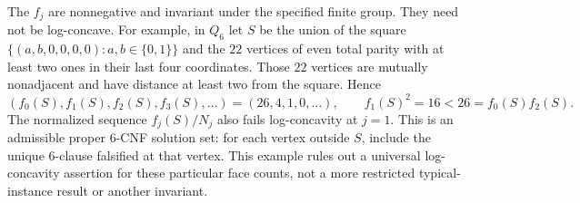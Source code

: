 \begin{remark}
The $f_j$ are nonnegative and invariant under the specified finite group.
They need not be log-concave. For example, in $Q_6$ let $S$ be the union
of the square $\{(a,b,0,0,0,0):a,b\in\{0,1\}\}$ and the $22$ vertices
of even total parity with at least two ones in their last four coordinates.
Those $22$ vertices are mutually nonadjacent and have distance at least
two from the square. Hence
\[
 (f_0(S),f_1(S),f_2(S),f_3(S),\ldots)=(26,4,1,0,\ldots),
 \qquad f_1(S)^2=16<26=f_0(S)f_2(S).
\]
The normalized sequence $f_j(S)/N_j$ also fails log-concavity at $j=1$.
This is an admissible proper $6$-CNF solution set: for each vertex outside
$S$, include the unique $6$-clause falsified at that vertex. This example
rules out a universal log-concavity assertion for these particular face
counts, not a more restricted typical-instance result or another invariant.
\end{remark}
